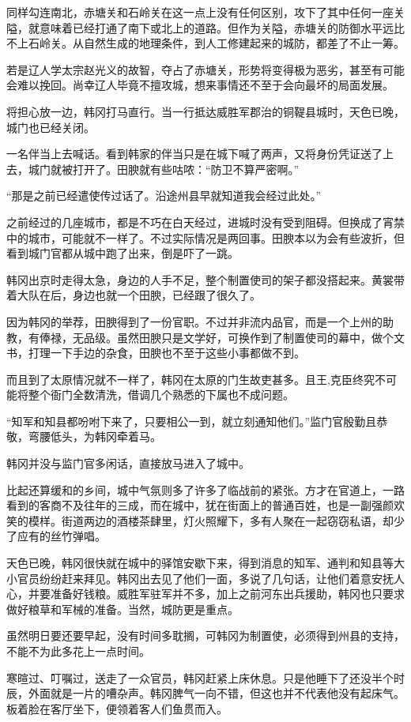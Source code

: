 同样勾连南北，赤塘关和石岭关在这一点上没有任何区别，攻下了其中任何一座关隘，就意味着已经打通了南下或北上的道路。但作为关隘，赤塘关的防御水平远比不上石岭关。从自然生成的地理条件，到人工修建起来的城防，都差了不止一筹。

若是辽人学太宗赵光义的故智，夺占了赤塘关，形势将变得极为恶劣，甚至有可能会难以挽回。尚幸辽人毕竟不擅攻城，想来事情还不至于会向最坏的局面发展。

将担心放一边，韩冈打马直行。当一行抵达威胜军郡治的铜鞮县城时，天色已晚，城门也已经关闭。

一名伴当上去喊话。看到韩家的伴当只是在城下喊了两声，又将身份凭证送了上去，城门就被打开了。田腴就有些咕哝：“防卫不算严密啊。”

“那是之前已经遣使传过话了。沿途州县早就知道我会经过此处。”

之前经过的几座城市，都是不巧在白天经过，进城时没有受到阻碍。但换成了宵禁中的城市，可能就不一样了。不过实际情况是两回事。田腴本以为会有些波折，但看到城门官都从城中跑了出来，倒是吓了一跳。

韩冈出京时走得太急，身边的人手不足，整个制置使司的架子都没搭起来。黄裳带着大队在后，身边也就一个田腴，已经跟了很久了。

因为韩冈的举荐，田腴得到了一份官职。不过并非流内品官，而是一个上州的助教，有俸禄，无品级。虽然田腴只是文学好，可换作到了制置使司的幕中，做个文书，打理一下手边的杂食，田腴也不至于这些小事都做不到。

而且到了太原情况就不一样了，韩冈在太原的门生故吏甚多。且王,克臣终究不可能将整个衙门全数清洗，借调几个熟悉的下属也不成问题。

“知军和知县都吩咐下来了，只要相公一到，就立刻通知他们。”监门官殷勤且恭敬，弯腰低头，为韩冈牵着马。

韩冈并没与监门官多闲话，直接放马进入了城中。

比起还算缓和的乡间，城中气氛则多了许多了临战前的紧张。方才在官道上，一路看到的客商不及往年的三成，而在城中，犹在街面上的普通百姓，也是一副强颜欢笑的模样。街道两边的酒楼茶肆里，灯火照耀下，多有人聚在一起窃窃私语，却少了应有的丝竹弹唱。

天色已晚，韩冈很快就在城中的驿馆安歇下来，得到消息的知军、通判和知县等大小官员纷纷赶来拜见。韩冈出去见了他们一面，多说了几句话，让他们着意安抚人心，并要准备好钱粮。威胜军驻军并不多，加上之前河东出兵援助，韩冈也只要求做好粮草和军械的准备。当然，城防更是重点。

虽然明日要还要早起，没有时间多耽搁，可韩冈为制置使，必须得到州县的支持，不能不为此多花上一点时间。

寒暄过、叮嘱过，送走了一众官员，韩冈赶紧上床休息。只是他睡下了还没半个时辰，外面就是一片的嘈杂声。韩冈脾气一向不错，但这也并不代表他没有起床气。板着脸在客厅坐下，便领着客人们鱼贯而入。

